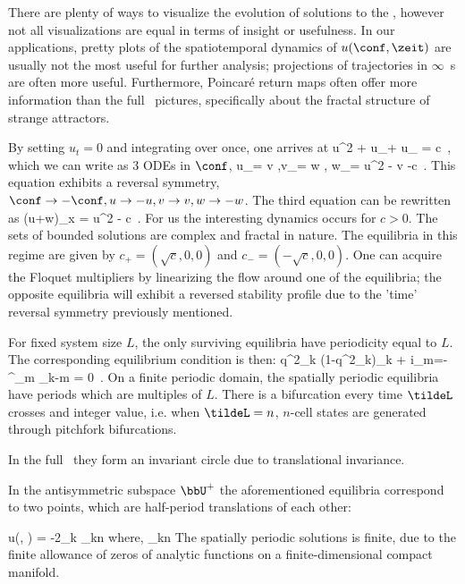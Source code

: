 There are plenty of ways to visualize the evolution of solutions to the
\KSe, however not all visualizations are equal in terms of insight or
usefulness. In our applications, pretty plots of the spatiotemporal
dynamics of $u(\conf, \zeit)$ are usually not the most useful for further
analysis; projections of trajectories in $\infty$\dmn\ \statesp s are often
more useful.
Furthermore, Poincar\'e return maps often offer more information than the
full \statesp\ pictures, specifically about the fractal structure of
strange attractors.


By setting $u_t = 0$ and integrating over  once, one arrives at
\beq
{}u^2 + u_\conf + u_{\conf \conf \conf} = c
\,,
\eeq
which we can write as $3$ ODEs in $\conf$,
\beq
u_\conf = v ,\quad v_\conf = w , \quad w_\conf = u^2 - v -c
\,.
\eeq
This equation exhibits a reversal symmetry, $\conf \rightarrow
-\conf , u \rightarrow -u , v \rightarrow v , w \rightarrow -w$.
The third equation can be rewritten as
\beq
(u+w)_x = u^2 - c
\,.
\eeq
For us the interesting dynamics occurs for $c>0$. The sets of bounded
solutions are complex and fractal in nature. The equilibria in this
regime are given by $c_+ = (\sqrt{c},0,0)$ and $c_- = (-\sqrt{c},0,0)$.
One can acquire the Floquet multipliers by linearizing the flow around
one of the equilibria; the opposite equilibria will exhibit a reversed
stability profile due to the 'time' reversal symmetry previously
mentioned.

For fixed system size $L$, the only surviving equilibria have periodicity
equal to $L$. The corresponding equilibrium condition is then:
\beq
q^2_k (1-q^2_k)\utensor_k + i\sum_{m=-\infty}^{\infty}\utensor_m \utensor_{k-m} = 0
\,.
\eeq
On a finite periodic domain, the spatially periodic equilibria have periods which
are multiples of $L$. There is a bifurcation every time $\tildeL$
crosses and integer value, i.e. when $\tildeL = n$, $n$-cell states are
generated through pitchfork bifurcations.

In the full \statesp\ they form an invariant circle due to translational
invariance.

In the antisymmetric subspace $\bbU^+$ the aforementioned equilibria
correspond to two points, which are half-period translations of each
other:

\beq
\nonumber
u(\conf, \zeit) = -2\sum_k \utensor_{kn} \quad \mbox{where,} \quad \utensor_{kn} \in {}
\eeq
The spatially periodic solutions is finite, due to the finite allowance
of zeros of analytic functions on a finite-dimensional compact manifold.

